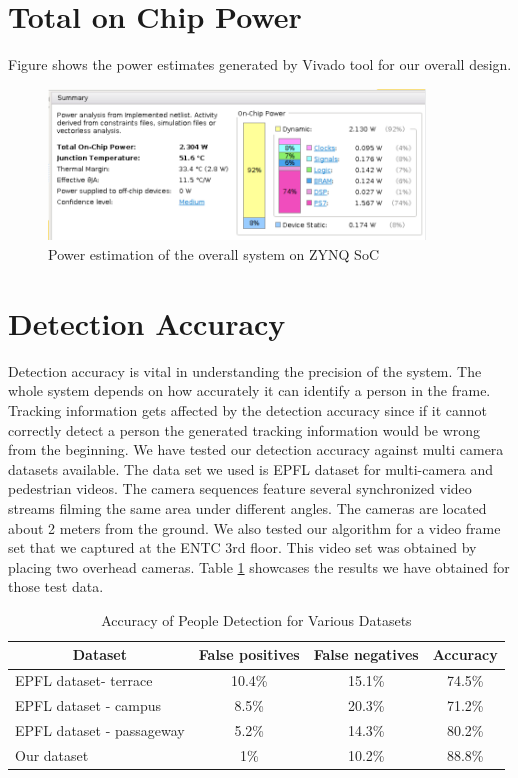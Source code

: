 \documentclass[12pt,a4paper]{report}
\begin{document}
\section{Total on Chip Power}
Figure shows the power estimates generated by Vivado tool for our overall design.
\begin{figure}[H]
\includegraphics[width=10cm]{power.png}
\centering
\caption{Power estimation of the overall system on ZYNQ SoC}
\label{flask}
\end{figure}

\section{Detection Accuracy}
Detection accuracy is vital in understanding the precision of the system. The whole system depends on how accurately it can identify a person in the frame. Tracking information gets affected by the detection accuracy since if it cannot correctly detect a person the generated tracking information would be wrong from the beginning.
We have tested our detection accuracy against multi camera datasets available. The data set we used is EPFL dataset for multi-camera and pedestrian videos. The camera sequences feature several synchronized video streams filming the same area under different angles. The cameras are located about 2 meters from the ground. We also tested our algorithm for a video frame set that we captured at the ENTC 3rd floor. This video set was obtained by placing two overhead cameras.
Table \ref{accuracy} showcases the results we have obtained for those test data.
\begin{table}[H]
\centering
\caption{Accuracy of People Detection for Various Datasets}
\label{accuracy}
\begin{tabular}{|l|c|c|c|}
\hline
\multicolumn{1}{|c|}{\textbf{Dataset}} & \textbf{False positives} & \textbf{False negatives} & \textbf{Accuracy} \\ \hline
EPFL dataset- terrace                  & 10.4\%                   & 15.1\%                   & 74.5\%            \\ \hline
EPFL dataset - campus                  & 8.5\%                    & 20.3\%                   & 71.2\%            \\ \hline
EPFL dataset - passageway              & 5.2\%                    & 14.3\%                   & 80.2\%            \\ \hline
Our dataset                            & 1\%                      & 10.2\%                   & 88.8\%            \\ \hline
\end{tabular}
\end{table}
\end{document}
